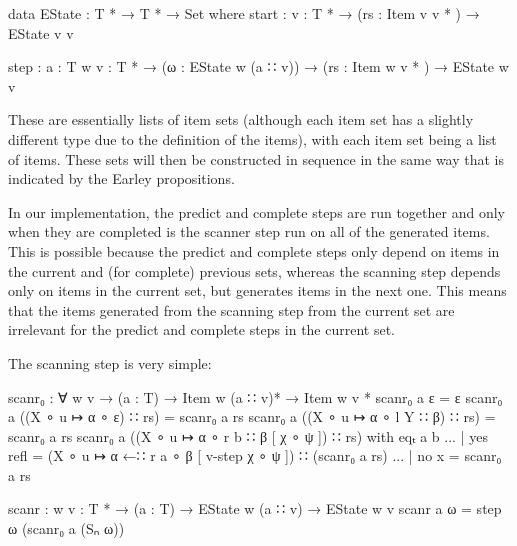 		\begin{code}
			  data EState : T * → T * → Set where
			    start : {v : T *} →
			      (rs : Item v v * ) →
			      EState v v

			    step : {a : T} {w v : T *} →
			      (ω : EState w (a ∷ v)) →
			      (rs : Item w v * ) →
			      EState w v
		\end{code}

		These are essentially lists of item sets (although each item set has a
		slightly different type due to the definition of the items), with each
		item set being a list of items. These sets will then be constructed in
		sequence in the same way that is indicated by the Earley propositions.

		In our implementation, the predict and complete steps are run together
		and only when they are completed is the scanner step run on all of the
		generated items. This is possible because the predict and complete
		steps only depend on items in the current and (for complete) previous
		sets, whereas the scanning step depends only on items in the current
		set, but generates items in the next one. This means that the items
		generated from the scanning step from the current set are irrelevant
		for the predict and complete steps in the current set.

		The scanning step is very simple:

		\begin{code}
			  scanr₀ : ∀ {w v} →
			    (a : T) →
			    Item w (a ∷ v)* →
			    Item w v *
			  scanr₀ a ε = ε
			  scanr₀ a ((X ∘ u ↦ α ∘ ε) ∷ rs) = scanr₀ a rs
			  scanr₀ a ((X ∘ u ↦ α ∘ l Y ∷ β) ∷ rs) = scanr₀ a rs
			  scanr₀ a ((X ∘ u ↦ α ∘ r b ∷ β [ χ ∘ ψ ]) ∷ rs) with eqₜ a b
			  ... | yes refl = (X ∘ u ↦ α ←∷ r a ∘ β [ v-step χ ∘ ψ ]) ∷ (scanr₀ a rs)
			  ... | no x = scanr₀ a rs

			  scanr : {w v : T *} →
			    (a : T) →
			    EState w (a ∷ v) →
			    EState w v
			  scanr a ω = step ω (scanr₀ a (Sₙ ω))
		\end{code}

